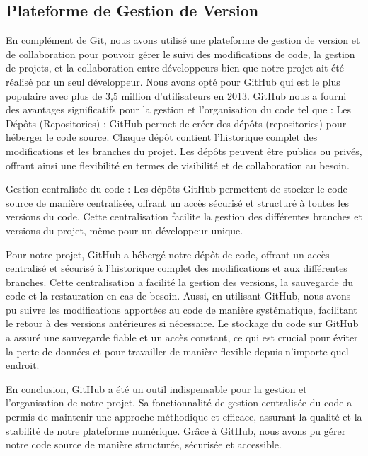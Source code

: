 \subsection{Plateforme de Gestion de Version}
En complément de Git, nous avons utilisé une plateforme de gestion de version et de collaboration pour pouvoir gérer le suivi des modifications de code, la gestion de projets, et la collaboration entre développeurs bien que notre projet ait été réalisé par un seul développeur. Nous avons opté pour GitHub qui est le plus populaire avec plus de 3,5 million d'utilisateurs \cite{lima2014coding} en 2013.
GitHub nous a fourni des avantages significatifs pour la gestion et l'organisation du code tel que :
Les Dépôts (Repositories) : GitHub permet de créer des dépôts (repositories) pour héberger le code source. Chaque dépôt contient l'historique complet des modifications et les branches du projet. Les dépôts peuvent être publics ou privés, offrant ainsi une flexibilité en termes de visibilité et de collaboration au besoin. \par
Gestion centralisée du code : Les dépôts GitHub permettent de stocker le code source de manière centralisée, offrant un accès sécurisé et structuré à toutes les versions du code. Cette centralisation facilite la gestion des différentes branches et versions du projet, même pour un développeur unique.
\par Pour notre projet, GitHub a hébergé notre dépôt de code, offrant un accès centralisé et sécurisé à l'historique complet des modifications et aux différentes branches. Cette centralisation a facilité la gestion des versions, la sauvegarde du code et la restauration en cas de besoin. Aussi, en utilisant GitHub, nous avons pu suivre les modifications apportées au code de manière systématique, facilitant le retour à des versions antérieures si nécessaire. Le stockage du code sur GitHub a assuré une sauvegarde fiable et un accès constant, ce qui est crucial pour éviter la perte de données et pour travailler de manière flexible depuis n'importe quel endroit. 
\par
En conclusion, GitHub a été un outil indispensable pour la gestion et l'organisation de notre projet. Sa fonctionnalité de gestion centralisée du code a permis de maintenir une approche méthodique et efficace, assurant la qualité et la stabilité de notre plateforme numérique. Grâce à GitHub, nous avons pu gérer notre code source de manière structurée, sécurisée et accessible.

